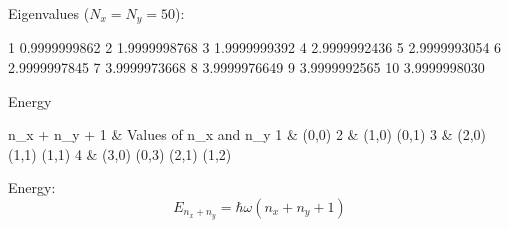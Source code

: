 Eigenvalues ($N_{x} = N_{y} = 50$):
\begin{textcode}
    1       0.9999999862
    2       1.9999998768
    3       1.9999999392
    4       2.9999992436
    5       2.9999993054
    6       2.9999997845
    7       3.9999973668
    8       3.9999976649
    9       3.9999992565
   10       3.9999998030
\end{textcode}


Energy
\begin{textcode}
n_x + n_y + 1  &  Values of n_x and n_y
1              &  (0,0)
2              &  (1,0) (0,1)
3              &  (2,0) (1,1) (1,1)
4              &  (3,0) (0,3) (2,1) (1,2)
\end{textcode}

Energy:
\begin{equation}
E_{n_{x} + n_{y}} = \hbar \omega \left( n_{x} + n_{y} + 1 \right)
\end{equation}
